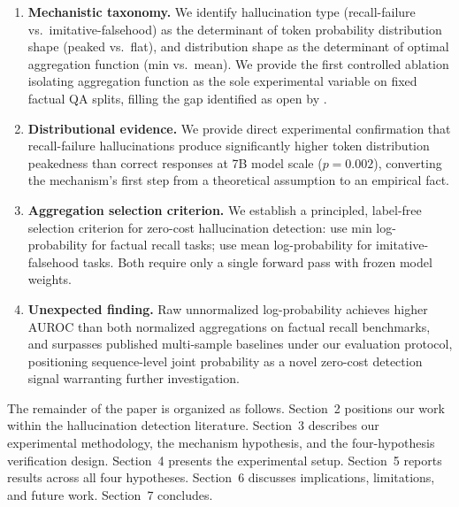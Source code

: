 \begin{enumerate}
\item \textbf{Mechanistic taxonomy.} We identify hallucination type (recall-failure vs.\ imitative-falsehood) as the determinant of token probability distribution shape (peaked vs.\ flat), and distribution shape as the determinant of optimal aggregation function (min vs.\ mean). We provide the first controlled ablation isolating aggregation function as the sole experimental variable on fixed factual QA splits, filling the gap identified as open by \citet{liu2025}.

\item \textbf{Distributional evidence.} We provide direct experimental confirmation that recall-failure hallucinations produce significantly higher token distribution peakedness than correct responses at 7B model scale ($p = 0.002$), converting the mechanism's first step from a theoretical assumption to an empirical fact.

\item \textbf{Aggregation selection criterion.} We establish a principled, label-free selection criterion for zero-cost hallucination detection: use min log-probability for factual recall tasks; use mean log-probability for imitative-falsehood tasks. Both require only a single forward pass with frozen model weights.

\item \textbf{Unexpected finding.} Raw unnormalized log-probability achieves higher AUROC than both normalized aggregations on factual recall benchmarks, and surpasses published multi-sample baselines under our evaluation protocol, positioning sequence-level joint probability as a novel zero-cost detection signal warranting further investigation.
\end{enumerate}

The remainder of the paper is organized as follows. Section~2 positions our work within the hallucination detection literature. Section~3 describes our experimental methodology, the mechanism hypothesis, and the four-hypothesis verification design. Section~4 presents the experimental setup. Section~5 reports results across all four hypotheses. Section~6 discusses implications, limitations, and future work. Section~7 concludes.
